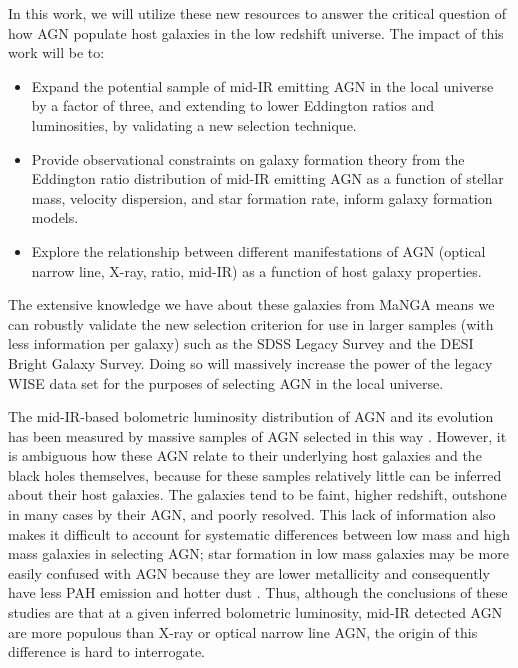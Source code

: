 \documentclass[12pt, preprint]{hacked-aastex}
\begin{document}
In this work, we will utilize these new resources to answer the 
critical question of how AGN populate host galaxies in the low redshift
universe. The impact of this work will be to:
\begin{itemize}
    \item Expand the potential sample of mid-IR emitting AGN in the local universe 
     by a factor of three, and extending to lower Eddington ratios and
     luminosities, by validating a new selection technique. 
    \item Provide observational constraints on galaxy formation theory from 
     the Eddington ratio  distribution  of mid-IR emitting  AGN as a function of
     stellar mass,  velocity dispersion, and star formation rate, inform galaxy
     formation models.
    \item Explore the relationship between different manifestations of AGN
    (optical narrow line, X-ray, ratio, mid-IR) as a function of host galaxy 
    properties. 
\end{itemize}

The extensive knowledge we have about these galaxies from MaNGA means we 
can robustly validate the new selection criterion for use in larger 
samples (with less information per galaxy) such as the SDSS Legacy 
Survey and the DESI Bright Galaxy Survey. Doing so will massively 
increase the power of the legacy WISE data set for the purposes of 
selecting AGN in the local universe.

The mid-IR-based bolometric luminosity distribution of 
AGN and its evolution has been measured by massive samples 
of AGN selected in this way \cite{lacy15a}. However, it is 
ambiguous how these AGN relate to their underlying host galaxies
and the black holes themselves, because for these samples
relatively little can be inferred about their host galaxies.
The galaxies tend to be faint, higher redshift, 
outshone in many cases by their AGN,
and poorly resolved.
This lack of information also makes it difficult 
to account for systematic
differences between low mass and high mass galaxies in 
selecting AGN; star formation in low mass galaxies may
be more easily confused with AGN 
because they are lower metallicity and consequently 
have less PAH emission and hotter dust
\cite{hainline16a, sajina22a}. Thus, although the conclusions of these 
studies are that at a given inferred bolometric luminosity,
mid-IR detected AGN are more populous than X-ray or optical
narrow line AGN, the origin of this difference is hard to
interrogate.
\end{document}
